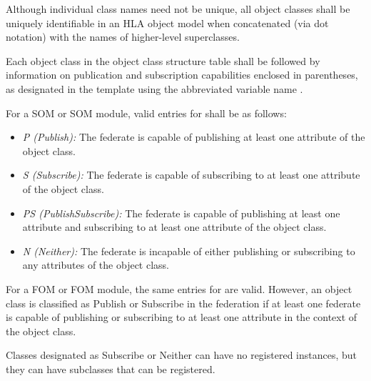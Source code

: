 Although individual class names need not be unique, all object classes shall be uniquely identifiable in an HLA object model when concatenated (via dot notation) with the names of higher-level superclasses.

Each object class in the object class structure table shall be followed by information on publication and subscription capabilities enclosed in parentheses, as designated in the template using the abbreviated variable name .

\newpage
For a SOM or SOM module, valid entries for  shall be as follows:
\begin{itemize}[leftmargin=32pt,labelwidth=10pt,labelsep=12pt,itemsep=2pt,topsep=2pt]
\item \textit{P (Publish):} The federate is capable of publishing at least one attribute of the object class.
\item \textit{S (Subscribe):} The federate is capable of subscribing to at least one attribute of the object class.
\item \textit{PS (PublishSubscribe):} The federate is capable of publishing at least one attribute and subscribing to at least one attribute of the object class.
\item \textit{N (Neither):} The federate is incapable of either publishing or subscribing to any attributes of the object class.
\end{itemize}

For a FOM or FOM module, the same entries for  are valid. However, an object class is classified as Publish or Subscribe in the federation if at least one federate is capable of publishing or subscribing to at least one attribute in the context of the object class.

Classes designated as Subscribe or Neither can have no registered instances, but they can have subclasses that can be registered.

\vspace{10pt}
\vspace{-7pt}

\vspace{8pt}

